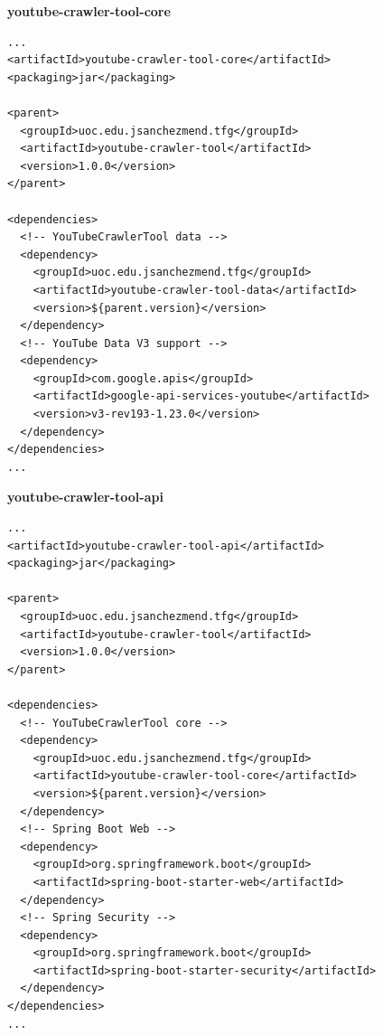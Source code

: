 \documentclass[11pt,a4paper]{article}
\begin{document}
\noindent\textbf{youtube-crawler-tool-core}
\begin{lstlisting}[style=C]
...
<artifactId>youtube-crawler-tool-core</artifactId>
<packaging>jar</packaging>

<parent>
  <groupId>uoc.edu.jsanchezmend.tfg</groupId>
  <artifactId>youtube-crawler-tool</artifactId>
  <version>1.0.0</version>
</parent>

<dependencies>
  <!-- YouTubeCrawlerTool data -->
  <dependency>
    <groupId>uoc.edu.jsanchezmend.tfg</groupId>
    <artifactId>youtube-crawler-tool-data</artifactId>
    <version>${parent.version}</version>
  </dependency>
  <!-- YouTube Data V3 support -->
  <dependency>
    <groupId>com.google.apis</groupId>
    <artifactId>google-api-services-youtube</artifactId>
    <version>v3-rev193-1.23.0</version>
  </dependency>
</dependencies>
...
\end{lstlisting}
\medskip

\noindent\textbf{youtube-crawler-tool-api}
\begin{lstlisting}[style=C]
...
<artifactId>youtube-crawler-tool-api</artifactId>
<packaging>jar</packaging>

<parent>
  <groupId>uoc.edu.jsanchezmend.tfg</groupId>
  <artifactId>youtube-crawler-tool</artifactId>
  <version>1.0.0</version>
</parent>

<dependencies>
  <!-- YouTubeCrawlerTool core -->
  <dependency>
    <groupId>uoc.edu.jsanchezmend.tfg</groupId>
    <artifactId>youtube-crawler-tool-core</artifactId>
    <version>${parent.version}</version>
  </dependency>
  <!-- Spring Boot Web -->
  <dependency>
    <groupId>org.springframework.boot</groupId>
    <artifactId>spring-boot-starter-web</artifactId>
  </dependency>
  <!-- Spring Security -->
  <dependency>
    <groupId>org.springframework.boot</groupId>
    <artifactId>spring-boot-starter-security</artifactId>
  </dependency>
</dependencies>
...
\end{lstlisting}
\medskip
\end{document}
